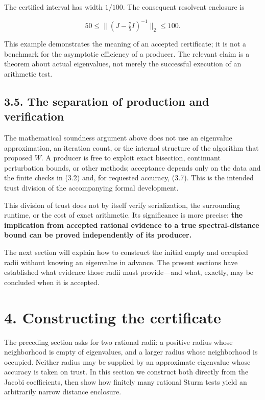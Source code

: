 \documentclass[
  11pt,
]{article}
\begin{document}
The certified interval has width \(1/100\). The consequent resolvent
enclosure is

\[
50\le\|(J-\tfrac75 I)^{-1}\|_2\le100.
\tag{3.18}
\]

This example demonstrates the meaning of an accepted certificate; it is
not a benchmark for the asymptotic efficiency of a producer. The
relevant claim is a theorem about actual eigenvalues, not merely the
successful execution of an arithmetic test.

\subsection{3.5. The separation of production and
verification}\label{the-separation-of-production-and-verification}

The mathematical soundness argument above does not use an eigenvalue
approximation, an iteration count, or the internal structure of the
algorithm that proposed \(W\). A producer is free to exploit exact
bisection, continuant perturbation bounds, or other methods; acceptance
depends only on the data and the finite checks in (3.2) and, for
requested accuracy, (3.7). This is the intended trust division of the
accompanying formal development.

This division of trust does not by itself verify serialization, the
surrounding runtime, or the cost of exact arithmetic. Its significance
is more precise: \textbf{the implication from accepted rational evidence
to a true spectral-distance bound can be proved independently of its
producer.}

The next section will explain how to construct the initial empty and
occupied radii without knowing an eigenvalue in advance. The present
sections have established what evidence those radii must provide---and
what, exactly, may be concluded when it is accepted.

\section{4. Constructing the
certificate}\label{constructing-the-certificate}

The preceding section asks for two rational radii: a positive radius
whose neighborhood is empty of eigenvalues, and a larger radius whose
neighborhood is occupied. Neither radius may be supplied by an
approximate eigenvalue whose accuracy is taken on trust. In this section
we construct both directly from the Jacobi coefficients, then show how
finitely many rational Sturm tests yield an arbitrarily narrow distance
enclosure.
\end{document}
